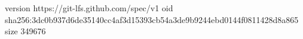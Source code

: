 version https://git-lfs.github.com/spec/v1
oid sha256:3dc0b937d6de35140cc4af3d15393cb54a3de9b9244ebd0144f0811428d8a865
size 349676
